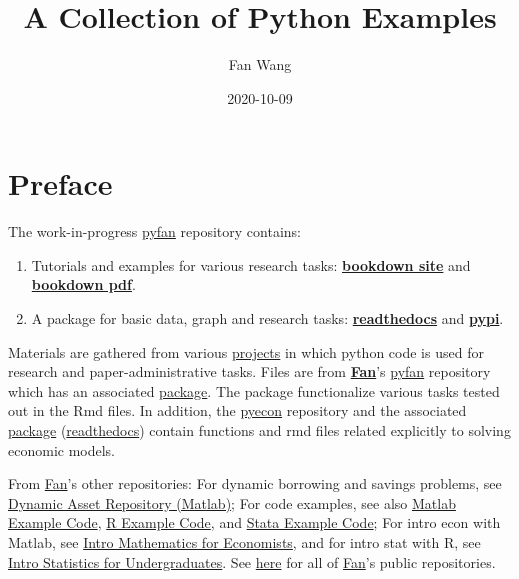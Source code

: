 \documentclass[
]{book}
\title{A Collection of Python Examples}
\author{Fan Wang}
\date{2020-10-09}
\providecommand{\tightlist}{%
  \setlength{\itemsep}{0pt}\setlength{\parskip}{0pt}}
\begin{document}
\maketitle

{
\hypersetup{linkcolor=}
\setcounter{tocdepth}{2}
\tableofcontents
}
\hypertarget{preface}{%
\chapter*{Preface}\label{preface}}

The work-in-progress \href{https://github.com/FanWangEcon/pyfan}{pyfan} repository contains:

\begin{enumerate}
\def\labelenumi{\arabic{enumi}.}
\tightlist
\item
  Tutorials and examples for various research tasks: \href{https://fanwangecon.github.io/pyfan/bookdown}{\textbf{bookdown site}} and \href{https://fanwangecon.github.io/pyfan/bookdown/A-Collection-of-Python-Examples.pdf}{\textbf{bookdown pdf}}.
\item
  A package for basic data, graph and research tasks: \href{https://pyfan.readthedocs.io/en/latest/}{\textbf{readthedocs}} and \href{https://pypi.org/project/pyfan/}{\textbf{pypi}}.
\end{enumerate}

Materials are gathered from various \href{https://fanwangecon.github.io/research}{projects} in which python code is used for research and paper-administrative tasks. Files are from \href{https://fanwangecon.github.io/}{\textbf{Fan}}'s \href{https://github.com/FanWangEcon/pyfan}{pyfan} repository which has an associated \href{https://pypi.org/project/pyfan/}{package}. The package functionalize various tasks tested out in the Rmd files. In addition, the \href{https://github.com/FanWangEcon/pyecon}{pyecon} repository and the associated \href{https://pypi.org/project/pyecon/}{package} (\href{https://pyfan.readthedocs.io/en/latest/autoapi/pyfan/index.html\#module-pyfan}{readthedocs}) contain functions and rmd files related explicitly to solving economic models.

From \href{https://fanwangecon.github.io/}{Fan}'s other repositories: For dynamic borrowing and savings problems, see \href{https://fanwangecon.github.io/CodeDynaAsset/}{Dynamic Asset Repository (Matlab)}; For code examples, see also \href{https://fanwangecon.github.io/M4Econ/}{Matlab Example Code}, \href{https://fanwangecon.github.io/R4Econ/}{R Example Code}, and \href{https://fanwangecon.github.io/Stata4Econ/}{Stata Example Code}; For intro econ with Matlab, see \href{https://fanwangecon.github.io/Math4Econ/}{Intro Mathematics for Economists}, and for intro stat with R, see \href{https://fanwangecon.github.io/Stat4Econ/}{Intro Statistics for Undergraduates}. See \href{https://github.com/FanWangEcon}{here} for all of \href{https://fanwangecon.github.io/}{Fan}'s public repositories.
\end{document}
